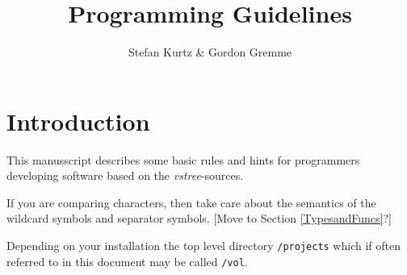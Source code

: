 \documentclass[12pt]{article}
\title{Programming Guidelines}
\author{Stefan Kurtz \& Gordon Gremme}
\begin{document}
\maketitle
\tableofcontents
\section*{Introduction}
This manusscript describes some  basic rules and hints
for programmers developing software based on the
\emph{vstree}-sources.

If you are comparing characters, then take care about the semantics
of the wildcard symbols and separator symbols. [Move to Section \ref{TypesandFuncs}?]

Depending on your installation the top level directory \texttt{/projects} which
if often referred to in this document may be called \texttt{/vol}.
\end{document}
